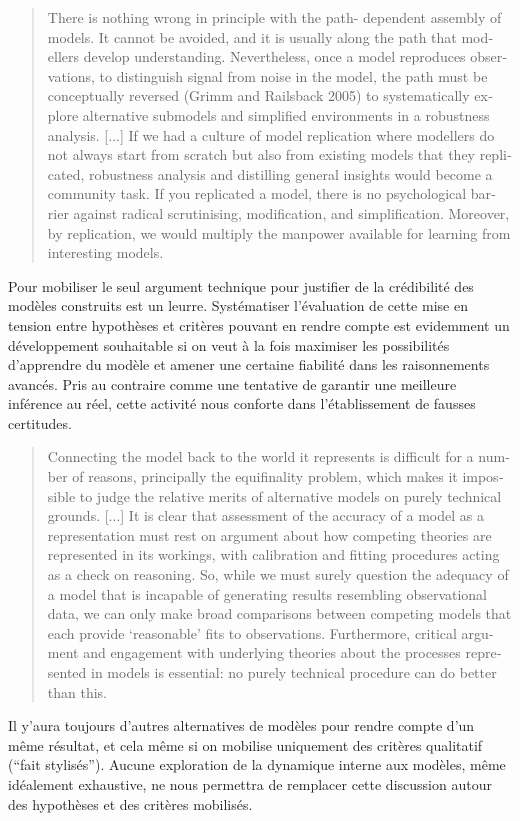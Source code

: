 \foreignblockquote{english}[\cite{Thiele2015}]{There is nothing wrong in principle with the path- dependent assembly of models. It cannot be avoided, and it is usually along the path that modellers develop understanding. Nevertheless, once a model reproduces observations, to distinguish signal from noise in the model, the path must be conceptually reversed (Grimm and Railsback 2005) to systematically explore alternative submodels and simplified environments in a robustness analysis. [...] If we had a culture of model replication where modellers do not always start from scratch but also from existing models that they replicated, robustness analysis and distilling general insights would become a community task. If you replicated a model, there is no psychological barrier against radical scrutinising, modification, and simplification. Moreover, by replication, we would multiply the manpower available for learning from interesting models.}

Pour \textcite{OSullivan2004} mobiliser le seul argument technique pour justifier de la crédibilité des modèles construits est un leurre. Systématiser l'évaluation de cette mise en tension entre hypothèses et critères pouvant en rendre compte est evidemment un développement souhaitable si on veut à la fois maximiser les possibilités d'apprendre du modèle et amener une certaine fiabilité dans les raisonnements avancés. Pris au contraire comme une tentative de garantir une meilleure inférence au réel, cette activité nous conforte dans l'établissement de fausses certitudes. 

\foreignblockquote{english}[\cite{OSullivan2004}]{Connecting the model back to the world it represents is difficult for a number of reasons, principally the equifinality problem, which makes it impossible to judge the relative merits of alternative models on purely technical grounds. [...] It is clear that assessment of the accuracy of a model as a representation must rest on argument about how competing theories are represented in its workings, with calibration and fitting procedures acting as a check on reasoning. So, while we must surely question the adequacy of a model that is incapable of generating results resembling observational data, we can only make broad comparisons between competing models that each provide ‘reasonable’ fits to observations. Furthermore, critical argument and engagement with underlying theories about the processes represented in models is essential: no purely technical procedure can do better than this.}

Il y'aura toujours d'autres alternatives de modèles pour rendre compte d'un même résultat, et cela même si on mobilise uniquement des critères qualitatif (\enquote{fait stylisés}). Aucune exploration de la dynamique interne aux modèles, même idéalement exhaustive, ne nous permettra de remplacer cette discussion autour des hypothèses et des critères mobilisés.

